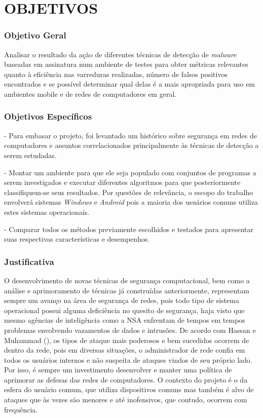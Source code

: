 \chapter{OBJETIVOS}
\label{c.objetivos}

 

\subsection{Objetivo Geral}
\label{s.objetivog}

Analisar o resultado da ação de diferentes técnicas de detecção de \textit{malware}
baseadas em assinatura num ambiente de testes para obter métricas relevantes
quanto à eficiência nas varreduras realizadas, número de falsos positivos
encontrados e se possível determinar qual delas é a mais apropriada para uso
em ambientes mobile e de redes de computadores em geral.
 
\subsection{Objetivos Específicos}
\label{s.ojetivosp}

- Para embasar o projeto, foi levantado um histórico sobre segurança em redes
  de computadores e assuntos correlacionados principalmente às técnicas de
  detecção a serem estudadas.

- Montar um ambiente para que ele seja populado com conjuntos de programas a
  serem investigados e executar diferentes algoritmos para que posteriormente
  classifiquem-se seus resultados. Por questões de relevância, o escopo do
  trabalho envolverá sistemas \textit{Windows} e \textit{Android} pois a maioria dos usuários
  comuns utiliza estes sistemas operacionais.

- Comparar todos os métodos previamente escolhidos e testados para apresentar
  suas respectivas características e desempenhos.


\subsection{Justificativa}
\label{s.justificativa}

O desenvolvimento de novas técnicas de segurança computacional, bem como a
análise e aprimoramento de técnicas já construídas anteriormente, representam
sempre um avanço na área de segurança de redes, pois todo tipo de sistema
operacional possui alguma deficiência no quesito de segurança, haja visto que
mesmo agências de inteligência como a NSA enfrentam de tempos em tempos
problemas envolvendo vazamentos de dados e intrusões. De acordo com Hassan e
Muhammad (\citeyear{hassan10}), os tipos de ataque mais poderosos e bem
sucedidos ocorrem de dentro da rede, pois em diversas situações, o
administrador de rede confia em todos os usuários internos e não suspeita de
ataques vindos de seu próprio lado. Por isso, é sempre um investimento
desenvolver e manter uma política de aprimorar as defesas das redes de
computadores. O contexto do projeto é o da esfera do usuário comum, que
utiliza dispositivos comuns mas também é alvo de ataques que às vezes são
menores e até inofensivos, que contudo, ocorrem com frequência.

